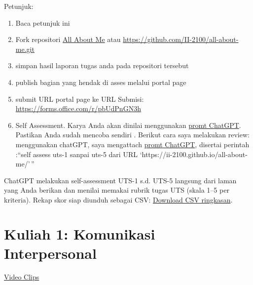 \documentclass[
  letterpaper,
  DIV=11,
  numbers=noendperiod]{scrreprt}
\begin{document}
\begin{tcolorbox}[enhanced jigsaw, opacitybacktitle=0.6, titlerule=0mm, colbacktitle=quarto-callout-important-color!10!white, rightrule=.15mm, colframe=quarto-callout-important-color-frame, breakable, arc=.35mm, leftrule=.75mm, bottomtitle=1mm, opacityback=0, toptitle=1mm, title=\textcolor{quarto-callout-important-color}{\faExclamation}\hspace{0.5em}{Important}, bottomrule=.15mm, coltitle=black, left=2mm, toprule=.15mm, colback=white]

Petunjuk:

\begin{enumerate}
\def\labelenumi{\arabic{enumi}.}
\item
  Baca petunjuk ini
\item
  Fork repositori \href{https://github.com/II-2100/all-about-me.git}{All
  About Me} atau \url{https://github.com/II-2100/all-about-me.git}
\item
  simpan hasil laporan tugas anda pada repositori tersebut
\item
  publish bagian yang hendak di asses melalui portal page
\item
  submit URL portal page ke URL Submisi:
  \url{https://forms.office.com/r/pbUdPnGN3h}
\item
  Self Assessment. Karya Anda akan dinilai menggunakan
  \href{asesmen/skor_uts.pdf}{promt ChatGPT}. Pastikan Anda sudah
  mencoba sendiri . Berikut cara saya melakukan review: menggunakan
  chatGPT, saya mengattach \href{asesmen/skor_uts.pdf}{promt ChatGPT},
  disertai perintah :``self assess uts-1 sanpai uts-5 dari URL
  `https://ii-2100.github.io/all-about-me/'\,''
\end{enumerate}

ChatGPT melakukan self-assessment UTS-1 s.d. UTS-5 langsung dari laman
yang Anda berikan dan menilai memakai rubrik tugas UTS (skala 1--5 per
kriteria). Rekap skor siap diunduh sebagai CSV:
\href{sandbox:/mnt/data/UTS_self_assessment.csv}{Download CSV
ringkasan}.

\end{tcolorbox}


\chapter{Kuliah 1: Komunikasi
Interpersonal}\label{kuliah-1-komunikasi-interpersonal}

\href{https://youtube.com/playlist?list=PL_m-BplfO92EHtF458s1yWRf6u0lGZQaZ&si=hAc9s5o7a4aHXJFO}{Video
Clips}
\end{document}
